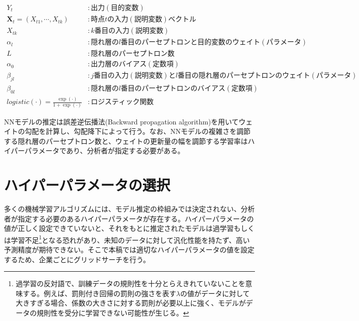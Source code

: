 \documentclass[a4paper, 12pt]{jsarticle}
\begin{document}
\begin{equation}
  \begin{split}
    Y_t &: 出力(目的変数) \\
    \bm{X}_t=(X_{t1}, \cdots, X_{tk}) &: 時点tの入力(説明変数)ベクトル \\
    X_{tk} &: k番目の入力(説明変数) \\
    \alpha_l &: 隠れ層のl番目のパーセプトロンと目的変数のウェイト(パラメータ) \\
    L &: 隠れ層のパーセプトロン数 \\
    \alpha_0 &: 出力層のバイアス(定数項) \\
    \beta_{jl} &: j番目の入力(説明変数)とl番目の隠れ層のパーセプトロンのウェイト(パラメータ) \\
    \beta_{0l} &: 隠れ層のl番目のパーセプトロンのバイアス(定数項) \\
    \textit{logistic}(\cdot) = \frac{\exp(\cdot)}{1 + \exp(\cdot)} &: ロジスティック関数
  \end{split}
\end{equation}

NNモデルの推定は誤差逆伝播法(Backward propagation algorithm)を用いてウェイトの勾配を計算し、勾配降下によって行う。なお、NNモデルの複雑さを調節する隠れ層のパーセプトロン数と、ウェイトの更新量の幅を調節する学習率はハイパーパラメータであり、分析者が指定する必要がある。

\section{ハイパーパラメータの選択} \label{sec:hyparam}

多くの機械学習アルゴリズムには、モデル推定の枠組みでは決定されない、分析者が指定する必要のあるハイパーパラメータが存在する。ハイパーパラメータの値が正しく設定できていないと、それをもとに推定されたモデルは過学習もしくは学習不足\footnote{過学習の反対語で、訓練データの規則性を十分とらえきれていないことを意味する。例えば、罰則付き回帰の罰則の強さを表す$\lambda$の値がデータに対して大きすぎる場合、係数の大きさに対する罰則が必要以上に強く、モデルがデータの規則性を受分に学習できない可能性が生じる。}となる恐れがあり、未知のデータに対して汎化性能を持たず、高い予測精度が期待できない。そこで本稿では適切なハイパーパラメータの値を設定するため、企業ごとにグリッドサーチを行う。
\end{document}
